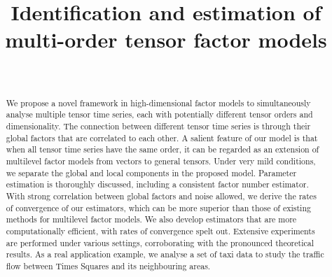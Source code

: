 \documentclass[aos]{imsart}
\theoremstyle{plain}
\theoremstyle{definition}
\begin{document}
\begin{frontmatter}
\title{Identification and estimation of multi-order tensor factor models}

\begin{aug}
\author[A]{~
} %
\address[A]{School of Mathematics,
University of Bristol
}

\end{aug}

\begin{abstract}
We propose a novel framework in high-dimensional factor models to simultaneously analyse multiple tensor time series, each with potentially different tensor orders and dimensionality. The connection between different tensor time series is through their global factors that are correlated to each other. A salient feature of our model is that when all tensor time series have the same order, it can be regarded as an extension of multilevel factor models from vectors to general tensors. Under very mild conditions, we separate the global and local components in the proposed model. Parameter estimation is thoroughly discussed, including a consistent factor number estimator. With strong correlation between global factors and noise allowed, we derive the rates of convergence of our estimators, which can be more superior than those of existing methods for multilevel factor models. We also develop estimators that are more computationally efficient, with rates of convergence spelt out. Extensive experiments are performed under various settings, corroborating with the pronounced theoretical results. As a real application example, we analyse a set of taxi data to study the traffic flow between Times Squares and its neighbouring areas.
\end{abstract}


\end{frontmatter}
\end{document}
